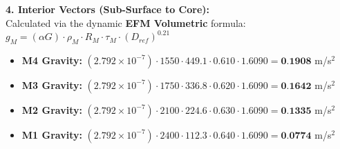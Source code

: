\documentclass[11pt, a4paper]{article}
\begin{document}
  \vspace{0.5em}
  \noindent \textbf{4. Interior Vectors (Sub-Surface to Core):} \\[0.5em]
  \hspace*{1em} Calculated via the dynamic \textbf{EFM Volumetric} formula: $g_M = (\alpha G) \cdot \rho_{M} \cdot R_M \cdot \tau_M \cdot (D_{ref})^{0.21}$
  \begin{itemize}
    \item \textbf{M4 Gravity:} $(2.792 \times 10^{-7}) \cdot 1550 \cdot 449.1 \cdot 0.610 \cdot 1.6090 = \textbf{0.1908}$ m/s$^2$
    \item \textbf{M3 Gravity:} $(2.792 \times 10^{-7}) \cdot 1750 \cdot 336.8 \cdot 0.620 \cdot 1.6090 = \textbf{0.1642}$ m/s$^2$
    \item \textbf{M2 Gravity:} $(2.792 \times 10^{-7}) \cdot 2100 \cdot 224.6 \cdot 0.630 \cdot 1.6090 = \textbf{0.1335}$ m/s$^2$
    \item \textbf{M1 Gravity:} $(2.792 \times 10^{-7}) \cdot 2400 \cdot 112.3 \cdot 0.640 \cdot 1.6090 = \textbf{0.0774}$ m/s$^2$
  \end{itemize}
\end{document}
